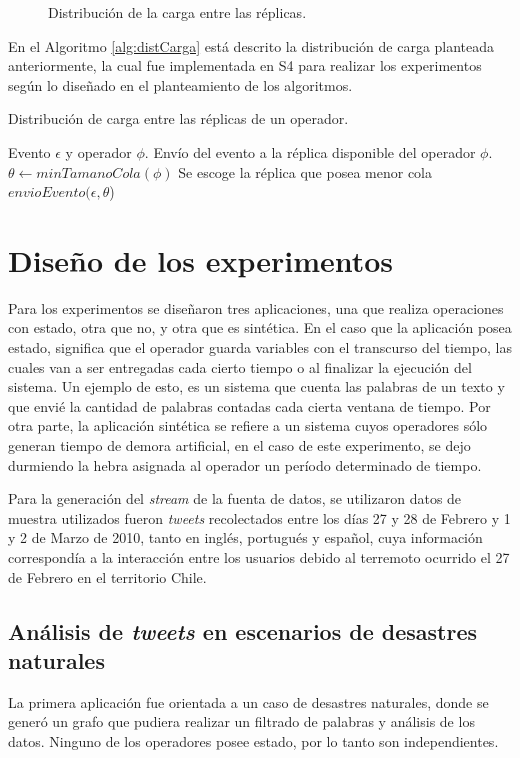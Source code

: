 \begin{figure}[!ht]
	\caption{Distribución de la carga entre las réplicas.}
	\label{fig:distCarga}
\end{figure}

En el Algoritmo \ref{alg:distCarga} está descrito la distribución de carga planteada anteriormente, la cual fue implementada en S4 para realizar los experimentos según lo diseñado en el planteamiento de los algoritmos.

\begin{algorithm}[!ht]
	\caption{Distribución de carga entre las réplicas de un operador.}
	\label{alg:distCarga}
	\begin{algorithmic}[1]
	\REQUIRE Evento $\epsilon$ y operador $\phi$.
	\ENSURE Envío del evento a la réplica disponible del operador $\phi$.
	\STATE $\theta \leftarrow minTamanoCola(\phi)$ \COMMENT Se escoge la réplica que posea menor cola
	\STATE $envioEvento(\epsilon,\theta$)
	\end{algorithmic}
\end{algorithm}

\section{Diseño de los experimentos}
Para los experimentos se diseñaron tres aplicaciones, una que realiza operaciones con estado, otra que no, y otra que es sintética. En el caso que la aplicación posea estado, significa que el operador guarda variables con el transcurso del tiempo, las cuales van a ser entregadas cada cierto tiempo o al finalizar la ejecución del sistema. Un ejemplo de esto, es un sistema que cuenta las palabras de un texto y que envié la cantidad de palabras contadas cada cierta ventana de tiempo. Por otra parte, la aplicación sintética se refiere a un sistema cuyos operadores sólo generan tiempo de demora artificial, en el caso de este experimento, se dejo durmiendo la hebra asignada al operador un período determinado de tiempo.

Para la generación del \textit{stream} de la fuenta de datos, se utilizaron datos de muestra utilizados fueron \textit{tweets} recolectados entre los días 27 y 28 de Febrero y 1 y 2 de Marzo de 2010, tanto en inglés, portugués y español, cuya información correspondía a la interacción entre los usuarios debido al terremoto ocurrido el 27 de Febrero en el territorio Chile.

\subsection{Análisis de \textit{tweets} en escenarios de desastres naturales}
La primera aplicación fue orientada a un caso de desastres naturales, donde se generó un grafo que pudiera realizar un filtrado de palabras y análisis de los datos. Ninguno de los operadores posee estado, por lo tanto son independientes.

